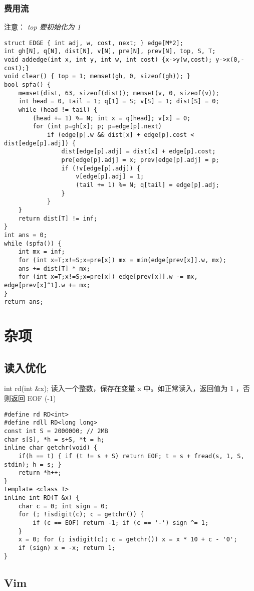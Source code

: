 \documentclass[landscape,a4paper]{article}
\begin{document}
\subsubsection{费用流}
注意： \emph{top 要初始化为 1}
\begin{lstlisting}
struct EDGE { int adj, w, cost, next; } edge[M*2];
int gh[N], q[N], dist[N], v[N], pre[N], prev[N], top, S, T;
void addedge(int x, int y, int w, int cost) {x->y(w,cost); y->x(0,-cost);}
void clear() { top = 1; memset(gh, 0, sizeof(gh)); }
bool spfa() {
	memset(dist, 63, sizeof(dist)); memset(v, 0, sizeof(v));
	int head = 0, tail = 1; q[1] = S; v[S] = 1; dist[S] = 0;
	while (head != tail) {
		(head += 1) %= N; int x = q[head]; v[x] = 0;
		for (int p=gh[x]; p; p=edge[p].next)
			if (edge[p].w && dist[x] + edge[p].cost < dist[edge[p].adj]) {
				dist[edge[p].adj] = dist[x] + edge[p].cost;
				pre[edge[p].adj] = x; prev[edge[p].adj] = p;
				if (!v[edge[p].adj]) {
					v[edge[p].adj] = 1;
					(tail += 1) %= N; q[tail] = edge[p].adj;
				}
			}
	}
	return dist[T] != inf;
}
int ans = 0;
while (spfa()) {
	int mx = inf;
	for (int x=T;x!=S;x=pre[x]) mx = min(edge[prev[x]].w, mx);
	ans += dist[T] * mx; 
	for (int x=T;x!=S;x=pre[x]) edge[prev[x]].w -= mx, edge[prev[x]^1].w += mx;
}
return ans;
\end{lstlisting}

\section{杂项}

\subsection{读入优化}

int rd(int \&x); 读入一个整数，保存在变量 x 中。如正常读入，返回值为 1 ，否则返回 EOF (-1)

\begin{lstlisting}
#define rd RD<int>
#define rdll RD<long long>
const int S = 2000000; // 2MB
char s[S], *h = s+S, *t = h;
inline char getchr(void) {
	if(h == t) { if (t != s + S) return EOF; t = s + fread(s, 1, S, stdin); h = s; }
	return *h++;
}
template <class T>
inline int RD(T &x) {
	char c = 0; int sign = 0;
	for (; !isdigit(c); c = getchr()) {
		if (c == EOF) return -1; if (c == '-') sign ^= 1;
	}
	x = 0; for (; isdigit(c); c = getchr()) x = x * 10 + c - '0';
	if (sign) x = -x; return 1;
}
\end{lstlisting}

\subsection{Vim}
\end{document}
